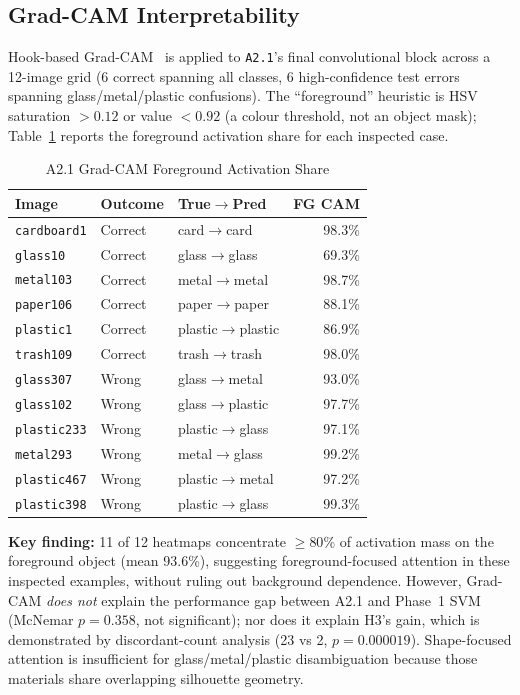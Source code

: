 \documentclass[conference]{IEEEtran}
\begin{document}
\subsection{Grad-CAM Interpretability}
\label{sec:gradcam}
Hook-based Grad-CAM~\cite{selvaraju2017gradcam} is applied to \texttt{A2.1}'s final convolutional block across a 12-image grid (6 correct spanning all classes, 6 high-confidence test errors spanning glass/metal/plastic confusions). The ``foreground'' heuristic is HSV saturation $> 0.12$ or value $< 0.92$ (a colour threshold, not an object mask); Table~\ref{tab:gradcam} reports the foreground activation share for each inspected case.


\begin{table}[t]
\caption{A2.1 Grad-CAM Foreground Activation Share}
\label{tab:gradcam}
\centering
\footnotesize
\setlength{\tabcolsep}{4pt}
\begin{tabular}{lllr}
\toprule
Image & Outcome & True$\to$Pred & FG CAM\\
\midrule
\texttt{cardboard1} & Correct & card$\to$card & 98.3\%\\
\texttt{glass10} & Correct & glass$\to$glass & 69.3\%\\
\texttt{metal103} & Correct & metal$\to$metal & 98.7\%\\
\texttt{paper106} & Correct & paper$\to$paper & 88.1\%\\
\texttt{plastic1} & Correct & plastic$\to$plastic & 86.9\%\\
\texttt{trash109} & Correct & trash$\to$trash & 98.0\%\\
\texttt{glass307} & Wrong & glass$\to$metal & 93.0\%\\
\texttt{glass102} & Wrong & glass$\to$plastic & 97.7\%\\
\texttt{plastic233} & Wrong & plastic$\to$glass & 97.1\%\\
\texttt{metal293} & Wrong & metal$\to$glass & 99.2\%\\
\texttt{plastic467} & Wrong & plastic$\to$metal & 97.2\%\\
\texttt{plastic398} & Wrong & plastic$\to$glass & 99.3\%\\
\bottomrule
\end{tabular}
\end{table}

\noindent\textbf{Key finding:} 11 of 12 heatmaps concentrate ${\geq}80\%$ of activation mass on the foreground object (mean 93.6\%), suggesting foreground-focused attention in these inspected examples, without ruling out background dependence. However, Grad-CAM \emph{does not} explain the performance gap between A2.1 and Phase~1 SVM (McNemar $p=0.358$, not significant); nor does it explain H3's gain, which is demonstrated by discordant-count analysis (23 vs 2, $p=0.000019$). Shape-focused attention is insufficient for glass/metal/plastic disambiguation because those materials share overlapping silhouette geometry.
\end{document}
